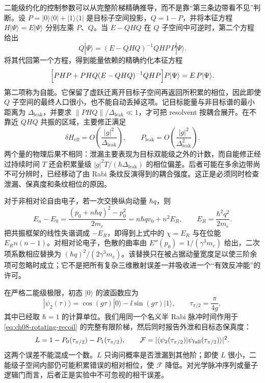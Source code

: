 二能级约化的控制参数可以从完整阶梯精确推导，而不是靠“第三条边带看不见”判断。设 $P=|0\rangle\langle0|+|1\rangle\langle1|$ 是目标子空间投影，$Q=1-P$，并将本征方程 $H|\Psi\rangle=E|\Psi\rangle$ 分别左乘 $P$、$Q$。当 $E-QHQ$ 在 $Q$ 子空间中可逆时，第二个方程给出
\begin{equation*}
Q|\Psi\rangle=(E-QHQ)^{-1}QHP\,P|\Psi\rangle.
\end{equation*}
将其代回第一个方程，得到能量依赖的精确约化本征方程
\begin{equation}
\Bigl[PHP+PHQ(E-QHQ)^{-1}QHP\Bigr]P|\Psi\rangle=E\,P|\Psi\rangle.
\label{eq:bragg-resolvent-effective}
\end{equation}
第二项称为自能。它保留了虚跃迁离开目标子空间再返回所积累的相位，因此即使 $Q$ 子空间的最终人口很小，也不能自动丢掉这项。记目标能量与非目标谱的最小距离为 $\Delta_{\mathrm{leak}}$，并要求 $\|PHQ\|/\Delta_{\mathrm{leak}}\ll1$，才可把 resolvent 按耦合展开。在不靠近 $QHQ$ 共振的区域，主要修正满足
\begin{equation}
\delta H_{\mathrm{eff}}=O\!\left(\frac{|g|^2}{\Delta_{\mathrm{leak}}}\right),\qquad
P_{\mathrm{leak}}=O\!\left(\frac{|g|^2}{\Delta_{\mathrm{leak}}^2}\right).
\label{eq:bragg-leakage-estimates}
\end{equation}
两个量的物理后果不相同：泄漏主要表现为目标双能级之外的计数，而自能修正经过持续时间 $T$ 还会积累量级 $|g|^2T/(\hbar\Delta_{\mathrm{leak}})$ 的相位偏差。后者可能在多余边带尚不可分辨时，已经移动了由 Rabi 条纹反演得到的耦合强度。这正是必须同时检查泄漏、保真度和条纹相位的原因。

对于非相对论自由电子，若一次交换纵向动量 $\hbar q$，则
\begin{equation}
E_n-E_0=\frac{(p_0+n\hbar q)^2-p_0^2}{2m_e}
=n\hbar qv_0+n^2E_R,\qquad E_R=\frac{\hbar^2q^2}{2m_e}.
\label{eq:bragg-recoil-from-dispersion}
\end{equation}
把共振框架的线性失谐调成 $-E_R$，即得到上式中的 $\chi=E_R$ 与在位能 $E_Rn(n-1)$。对相对论电子，色散的曲率由 $E''(p_0)=1/(\gamma^3m_e)$ 给出，二次项系数相应替换为 $(\hbar q)^2/(2\gamma^3m_e)$。该替换只在被占据动量宽度足以使三阶余项可忽略时成立；它不是把所有复杂三维散射误差一并吸收进一个“有效反冲能”的许可。

在严格二能级极限，初态 $|0\rangle$ 的波函数应为
\begin{equation}
|\psi_2(\tau)\rangle=\cos(g\tau)|0\rangle-\ii\sin(g\tau)|1\rangle,
\qquad \tau_{\pi/2}=\frac{\pi}{4g},
\label{eq:ch08-bragg-target}
\end{equation}
其中已经取 $\hbar=1$ 的计算单位。我们用同一个名义半 Rabi 脉冲时间作用于\cref{eq:ch08-rotating-recoil} 的完整有限阶梯，然后同时报告外泄和目标态保真度：
\begin{equation}
L=1-P_0(\tau_{\pi/2})-P_1(\tau_{\pi/2}),\qquad
\mathcal F=|\langle\psi_2(\tau_{\pi/2})|\psi_{\rm full}(\tau_{\pi/2})\rangle|^2.
\label{eq:ch08-leakage-fidelity}
\end{equation}
这两个误差不能混成一个数。$L$ 只询问概率是否泄漏到其他阶；即使 $L$ 很小，二能级子空间内部仍可能积累错误的相对相位，使 $\mathcal F$ 降低。对光学脉冲序列或量子逻辑门而言，后者正是实验中不可忽视的相干误差。

